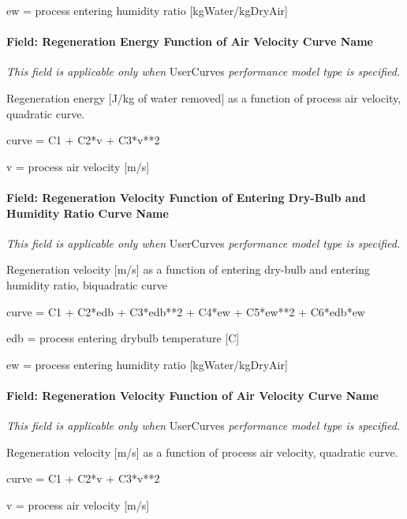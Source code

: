 ew = process entering humidity ratio {[}kgWater/kgDryAir{]}

\paragraph{Field: Regeneration Energy Function of Air Velocity Curve Name}\label{field-regeneration-energy-function-of-air-velocity-curve-name}

\emph{This field is applicable only when} UserCurves \emph{performance model type is specified.}

Regeneration energy {[}J/kg of water removed{]} as a function of process air velocity, quadratic curve.

curve = C1 + C2*v + C3*v**2

v = process air velocity {[}m/s{]}

\paragraph{Field: Regeneration Velocity Function of Entering Dry-Bulb and Humidity Ratio Curve Name}\label{field-regeneration-velocity-function-of-entering-dry-bulb-and-humidity-ratio-curve-name}

\emph{This field is applicable only when} UserCurves \emph{performance model type is specified.}

Regeneration velocity {[}m/s{]} as a function of entering dry-bulb and entering humidity ratio, biquadratic curve

curve = C1 + C2*edb + C3*edb**2 + C4*ew + C5*ew**2 + C6*edb*ew

edb = process entering drybulb temperature {[}C{]}

ew = process entering humidity ratio {[}kgWater/kgDryAir{]}

\paragraph{Field: Regeneration Velocity Function of Air Velocity Curve Name}\label{field-regeneration-velocity-function-of-air-velocity-curve-name}

\emph{This field is applicable only when} UserCurves \emph{performance model type is specified.}

Regeneration velocity {[}m/s{]} as a function of process air velocity, quadratic curve.

curve = C1 + C2*v + C3*v**2

v = process air velocity {[}m/s{]}

